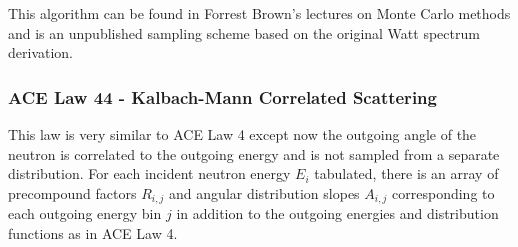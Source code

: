 This algorithm can be found in Forrest Brown's lectures on Monte Carlo methods
\cite{lanl-brown-2005} and is an unpublished sampling scheme based on the
original Watt spectrum derivation.

\subsubsection{ACE Law 44 - Kalbach-Mann Correlated Scattering}

This law is very similar to ACE Law 4 except now the outgoing angle of the
neutron is correlated to the outgoing energy and is not sampled from a separate
distribution. For each incident neutron energy $E_i$ tabulated, there is
an array of precompound factors $R_{i,j}$ and angular distribution slopes
$A_{i,j}$ corresponding to each outgoing energy bin $j$ in addition
to the outgoing energies and distribution functions as in ACE Law 4.

